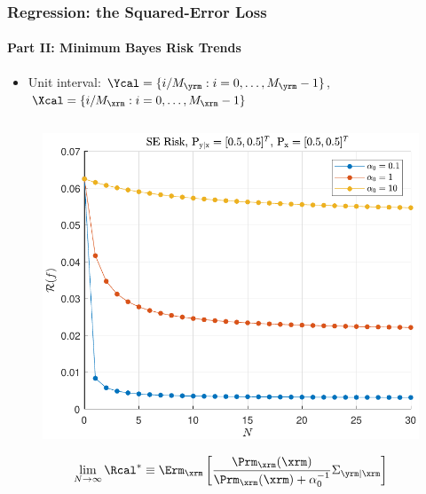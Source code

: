 \documentclass[aspectratio=169,usenames,dvipsnames]{beamer}
\begin{document}
\begin{frame}
\frametitle{Regression: the Squared-Error Loss}
\framesubtitle{Part II: Minimum Bayes Risk Trends}

\begin{itemize}
\item Unit interval:  $\Ycal = \{ i/M_{\yrm} : i = 0,\ldots,M_{\yrm}-1 \}$, $\Xcal = \{ i/M_{\xrm} : i = 0,\ldots,M_{\xrm}-1 \}$
\end{itemize}

\begin{columns}[c]

\begin{column}{0.5\linewidth}
\begin{figure}
\centering
\includegraphics[width=0.9\linewidth]{Risk_SE_Dir_IO_N_leg_a0.pdf}
\end{figure}
%
\vspace{-0.25em}
\begin{equation*}
\lim_{N \to \infty} \Rcal^* \equiv \Erm_{\xrm} \left[ \frac{\Prm_{\xrm}(\xrm)}{\Prm_{\xrm}(\xrm) + \alpha_0^{-1}} \Sigma_{\yrm | \xrm} \right] 
\end{equation*}

\end{column}


\end{columns}
\end{frame}
\end{document}
